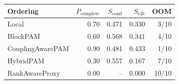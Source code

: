 \begin{tabular}{lrrrr}
\toprule
Ordering & $P_{\mathrm{complete}}$ & $S_{\mathrm{cond}}$ & $S_{\mathrm{e2e}}$ & OOM \\
\midrule
Local & 0.70 & 0.471 & 0.330 & 3/10 \\
BlockPAM & 0.60 & 0.568 & 0.341 & 4/10 \\
CouplingAwarePAM & 0.90 & 0.481 & 0.433 & 1/10 \\
HybridPAM & 0.30 & 0.557 & 0.167 & 7/10 \\
RankAwareProxy & 0.00 & -- & 0.000 & 10/10 \\
\bottomrule
\end{tabular}
